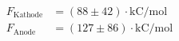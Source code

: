 \begin{align*}
F_\text{Kathode} &= (88 \pm 42)\cdot \text{kC/mol}\\
F_\text{Anode} &= (127 \pm 86)\cdot \text{kC/mol} \\
\end{align*}
